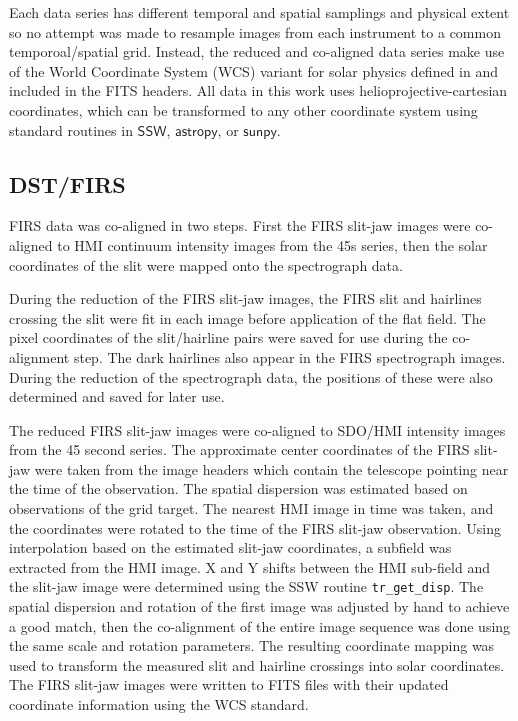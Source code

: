 \documentclass[twocolumn]{aastex62}
\newcommand{\code}[1]{\ensuremath{\textsf{#1}}}
\newcommand{\fnc}[1]{\code{#1}}
\begin{document}
Each data series has different temporal and spatial samplings and physical extent so no attempt was made to resample images from each instrument to a common temporoal/spatial grid.  
Instead, the reduced and co-aligned data series make use of the World Coordinate System (WCS) variant for solar physics defined in \citet{2006Thompson} and included in the FITS headers.  
All data in this work uses helioprojective-cartesian coordinates, which can be transformed to any other coordinate system using standard routines in \fnc{SSW}, \fnc{astropy}, or \fnc{sunpy}.\par

\subsection{DST/FIRS}
FIRS data was co-aligned in two steps. First the FIRS slit-jaw images were co-aligned to HMI continuum intensity images from the 45s series, then the solar coordinates of the slit were mapped onto the spectrograph data.

During the reduction of the FIRS slit-jaw images, the FIRS slit and hairlines crossing the slit were fit in each image before application of the flat field.  The pixel coordinates of the slit/hairline pairs were saved for use during the co-alignment step.  The dark hairlines also appear in the FIRS spectrograph images.  During the reduction of the spectrograph data, the positions of these were also determined and saved for later use.

The reduced FIRS slit-jaw images were co-aligned to SDO/HMI intensity images from the 45 second series.  The approximate center coordinates of the FIRS slit-jaw were taken from the image headers which contain the telescope pointing near the time of the observation.  The spatial dispersion was estimated based on observations of the grid target.  The nearest HMI image in time was taken, and the coordinates were rotated to the time of the FIRS slit-jaw observation.  Using interpolation based on the estimated slit-jaw coordinates, a subfield was extracted from the HMI image.  X and Y shifts between the HMI sub-field and the slit-jaw image were determined using the SSW routine \verb+tr_get_disp+.  The spatial dispersion and rotation of the first image was adjusted by hand to achieve a good match, then the co-alignment of the entire image sequence was done using the same scale and rotation parameters.  The resulting coordinate mapping was used to transform the measured slit and hairline crossings into solar coordinates.  The FIRS slit-jaw images were written to FITS files with their updated coordinate information using the WCS standard.
\end{document}
